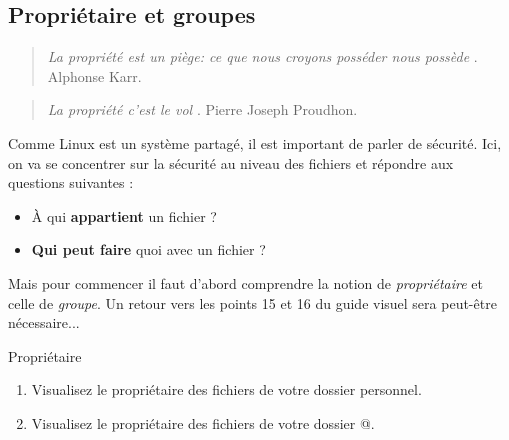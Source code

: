 \documentclass[a4paper,11pt]{article}
\begin{document}
\subsection{Propri\'etaire et groupes}
\begin{quotation}  
	\guillemotleft \textit{ La propri\'et\'e est un pi\`ege: ce que nous croyons poss\'eder nous poss\`ede }\guillemotright . 
	Alphonse Karr.  
\end{quotation}\begin{quotation}  
	\guillemotleft \textit{ La propri\'et\'e c'est le vol }\guillemotright . Pierre Joseph Proudhon.  
\end{quotation}  
Comme Linux est un syst\`eme partag\'e, il est important de parler de s\'ecurit\'e. 
Ici, on va se concentrer sur la s\'ecurit\'e au niveau des fichiers et r\'epondre aux questions suivantes :  

\par

\begin{itemize}
	
	\item \`A qui \textbf{appartient} un fichier ?
	\item \textbf{Qui peut faire} quoi avec un fichier ?
\end{itemize}

Mais pour commencer il faut d'abord comprendre la notion de \textit{propri\'etaire}
et celle de \textit{groupe}. 
Un retour vers les points 15 et 16 du guide visuel sera peut-\^etre n\'ecessaire...  

\par

\begin{Tutoriel}{Propriétaire}%
%
\begin{enumerate}
	
	\item 
	Visualisez le propri\'etaire des fichiers de votre dossier personnel.
	
	\item 
	Visualisez le propri\'etaire des fichiers de votre dossier @.
	
\end{enumerate}	
	
	\end{Tutoriel}
\end{document}
